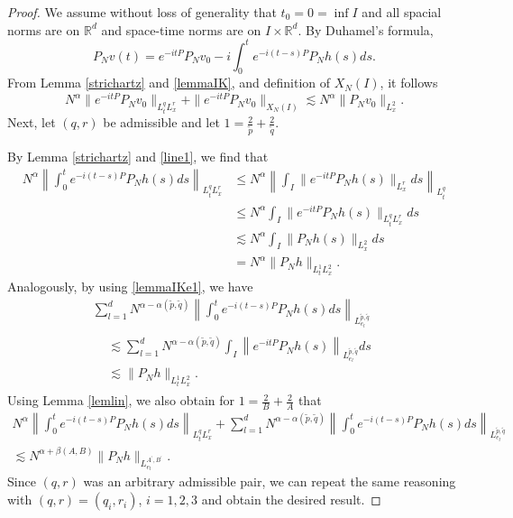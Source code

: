 \documentclass[10pt,leqno]{amsart}
\newcommand{\R}{\mathbb{R}} %
\numberwithin{equation}{section}
\begin{document}
\begin{proof}
We assume without loss of generality that $t_0 = 0=\inf I$ and all spacial norms are on $\R^d$ and space-time norms are on $I \times \R^d$. By Duhamel's formula,
$$P_N v(t)= e^{-it P}P_N v_0 - i \int_0^t e^{-i(t-s) P} P_N h(s) ds. $$
From Lemma \ref{strichartz} and \ref{lemmaIK}, and definition of $X_N(I)$, it follows
$$N^\alpha \|e^{-it P} P_N v_0 \|_{L_t^q L_x^r } + \|e^{-it P} P_N v_0 \|_{X_N (I)} \lesssim N^\alpha \|P_N v_0\|_{L_x^2}.$$
Next, let $(q, r)$ be  admissible and let $1= \frac{2}{\tilde{p}} +\frac{2}{\tilde{q}}$. 


By Lemma \ref{strichartz} and \eqref{line1}, we find that 
\begin{align*}
N^\alpha  \left\|\int_0^t e^{-i(t-s) P} P_N h(s) ds\right\|_{L_t^q L_x^r } 
 &\leq N^\alpha  \left\|\int_I \|e^{- i t P} P_N h(s)\|_{L_x^r} ds\right\|_{L_t^q} 
 \\
 &\leq N^\alpha  
\int_I \|e^{- i t P} P_N h(s)\|_{L_t^qL_x^r} ds
\\
& \lesssim N^\alpha \int_I \|P_N h(s)\|_{L^2_x} ds \\
&= N^\alpha  \|P_N h\|_{L^1_tL^2_x}.
\end{align*}
Analogously, by using \eqref{lemmaIKe1}, we have
\begin{multline*}
\sum_{l=1}^d N^{\alpha -\alpha (\tilde{p},\tilde q)} \left\|\int_0^t e^{-i(t-s) P} P_N h(s) ds\right\|_{L_{e_l}^{\tilde{p},\tilde q}  } \\
\begin{aligned}
 & \lesssim 
 \sum_{l=1}^d N^{\alpha -\alpha (\tilde{p},\tilde q)} \int_I \left\| e^{-it P} P_N h(s) \right\|_{L_{e_l}^{\tilde{p},\tilde q}  } ds \\
 &\lesssim \|P_N h\|_{L^1_tL^2_x}.
\end{aligned}
\end{multline*}
Using Lemma \ref{lemlin}, we also obtain for $1= \frac{2}{B} +\frac{2}{A}$ that
\begin{multline*}
N^\alpha  \left\|\int_0^t e^{-i(t-s) P} P_N h(s) ds\right\|_{L_t^q L_x^r} + \sum_{l=1}^d N^{\alpha -\alpha (\tilde{p},\tilde q )}   
\left\|\int_0^t e^{-i(t-s) P} P_N h(s) ds\right\|_{L_{e_l}^{\tilde{p},\tilde q}  }\\
 \lesssim N^{\alpha +\beta (A,B)}  \|P_N h\|_{L_{e_l}^{A^\prime ,B^\prime} } .
\end{multline*}
Since $(q, r)$ was an arbitrary admissible pair, we can repeat the same reasoning with $(q, r) = (q_i, r_i)$, $i = 1, 2, 3$ and obtain the desired result.
\end{proof}
\end{document}
